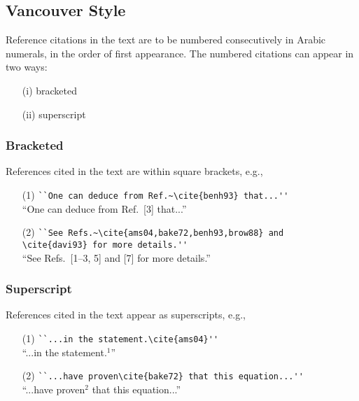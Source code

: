 \subsection{Vancouver Style}

Reference citations in the text are to be numbered consecutively in
Arabic numerals, in the order of first appearance. The numbered citations
can appear in two ways:

\begin{enumerate}
\item[(i)] bracketed
\item[(ii)] superscript
\end{enumerate}

\subsubsection{Bracketed}
References cited in the text are within square brackets, e.g.,

\begin{enumerate}
\item[(1)] \verb|``One can deduce from Ref.~\cite{benh93} that...''|\\
            ``One can deduce from Ref.~[3] that...''
\smallskip
\item[(2)] \verb|``See Refs.~\cite{ams04,bake72,benh93,brow88} and|\\
      \verb|\cite{davi93} for more details.''|\\
      ``See Refs.~[1--3, 5] and [7] for more details.''
\end{enumerate}

\subsubsection{Superscript}

References cited in the text appear as superscripts, e.g.,

\begin{enumerate}
\item[(1)] \verb|``...in the statement.\cite{ams04}''|\\
            ``...in the statement.$^1$''
\smallskip
\item[(2)] \verb|``...have proven\cite{bake72} that this equation...''|\\
            ``...have proven$^2$ that this equation...''
\end{enumerate}

